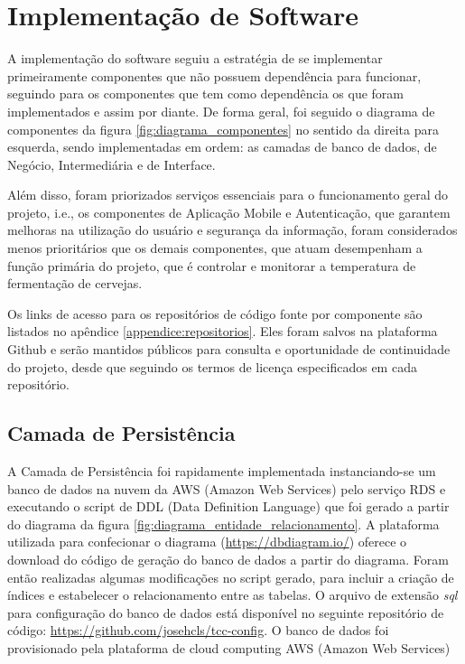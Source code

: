 \section{Implementação de Software}

A implementação do software seguiu a estratégia de se implementar primeiramente componentes que não possuem dependência para funcionar, seguindo para os componentes que tem como dependência os que foram implementados e assim por diante. De forma geral, foi seguido o diagrama de componentes da figura \ref{fig:diagrama_componentes} no sentido da direita para esquerda, sendo implementadas em ordem: as camadas de banco de dados, de Negócio, Intermediária e de Interface. 


Além disso, foram priorizados serviços essenciais para o funcionamento geral do projeto, i.e., os componentes de Aplicação Mobile e Autenticação, que garantem melhoras na utilização do usuário e segurança da informação, foram considerados menos prioritários que os demais componentes, que atuam desempenham a função primária do projeto, que é controlar e monitorar a temperatura de fermentação de cervejas.


Os links de acesso para os repositórios de código fonte por componente são listados no apêndice \ref{appendice:repositorios}. Eles foram salvos na plataforma Github e serão mantidos públicos para consulta e oportunidade de continuidade do projeto, desde que seguindo os termos de licença especificados em cada repositório.


\subsection{Camada de Persistência}


A Camada de Persistência foi rapidamente implementada instanciando-se um banco de dados na nuvem da AWS (Amazon Web Services) pelo serviço RDS e executando o script de DDL (Data Definition Language) que foi gerado a partir do diagrama da figura \ref{fig:diagrama_entidade_relacionamento}. A plataforma utilizada para confecionar o diagrama (\url{https://dbdiagram.io/}) oferece o download do código de geração do banco de dados a partir do diagrama. Foram então realizadas algumas modificações no script gerado, para incluir a criação de índices e estabelecer o relacionamento entre as tabelas. O arquivo de extensão \textit{sql} para configuração do banco de dados está disponível no seguinte repositório de código: \url{https://github.com/josehcls/tcc-config}. O banco de dados foi provisionado pela plataforma de cloud computing AWS (Amazon Web Services)  


